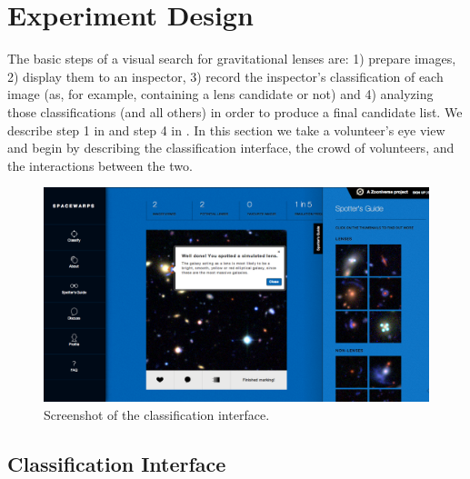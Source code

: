 \documentclass[useAMS,usenatbib,a4paper]{mn2e}
\begin{document}

\section{Experiment Design}
\label{sec:design}

The basic steps of a visual search for gravitational lenses are: 1) prepare
images, 2) display them to an inspector, 3) record the inspector's
classification of each image (as, for example, containing a lens candidate or
not) and 4) analyzing those classifications (and all others) in order to
produce a final candidate list. We describe step 1 in  and step
4 in . In this section we take a volunteer's eye view and
begin by describing the \sw classification interface, the crowd of volunteers,
and the interactions between the two.

\begin{figure}
\centering\includegraphics[width=0.9\linewidth]{sw-system-figs/sw-screengrab-marker+feedback.png}
\caption{Screenshot of the \sw classification interface.}
\label{fig:screenshot}
\end{figure}


\subsection{Classification Interface}
\label{sec:design:interface}
\end{document}
